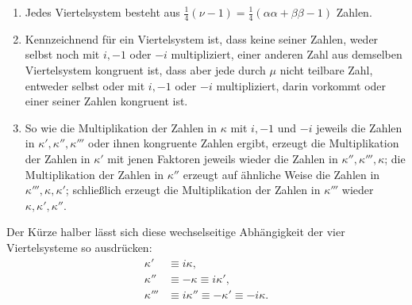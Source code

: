 \begin{enumerate}
\renewcommand{\labelenumi}{\arabic{enumi})}
\item Jedes Viertelsystem besteht aus $\frac14(\nu-1)=\frac14(\alpha\alpha+\beta\beta-1)$ Zahlen.
\item Kennzeichnend für ein Viertelsystem ist, dass keine seiner Zahlen, weder selbst noch mit $i,-1$ oder $-i$ multipliziert, einer anderen Zahl aus demselben Viertelsystem kongruent ist, dass aber jede durch $\mu$ nicht teilbare Zahl, entweder selbst oder mit $i,-1$ oder $-i$ multipliziert, darin vorkommt oder einer seiner Zahlen kongruent ist.
\item So wie die Multiplikation der Zahlen in $\kappa$ mit $i,-1$ und $-i$ jeweils die Zahlen in $\kappa',\kappa'',\kappa'''$ oder ihnen kongruente Zahlen ergibt, erzeugt die Multiplikation der Zahlen in $\kappa'$ mit jenen Faktoren jeweils wieder die Zahlen in $\kappa'',\kappa''',\kappa$; die Multiplikation der Zahlen in $\kappa''$ erzeugt auf ähnliche Weise die Zahlen in $\kappa''',\kappa,\kappa'$; schließlich erzeugt die Multiplikation der Zahlen in $\kappa'''$ wieder $\kappa,\kappa',\kappa''$.
\end{enumerate}

Der Kürze halber lässt sich diese wechselseitige Abhängigkeit der vier Viertelsysteme so ausdrücken:
\[
\begin{aligned}
\kappa'&\equiv i\kappa,\\
\kappa''&\equiv-\kappa\equiv i\kappa',\\
\kappa'''&\equiv i\kappa''\equiv-\kappa'\equiv-i\kappa.
\end{aligned}
\]
